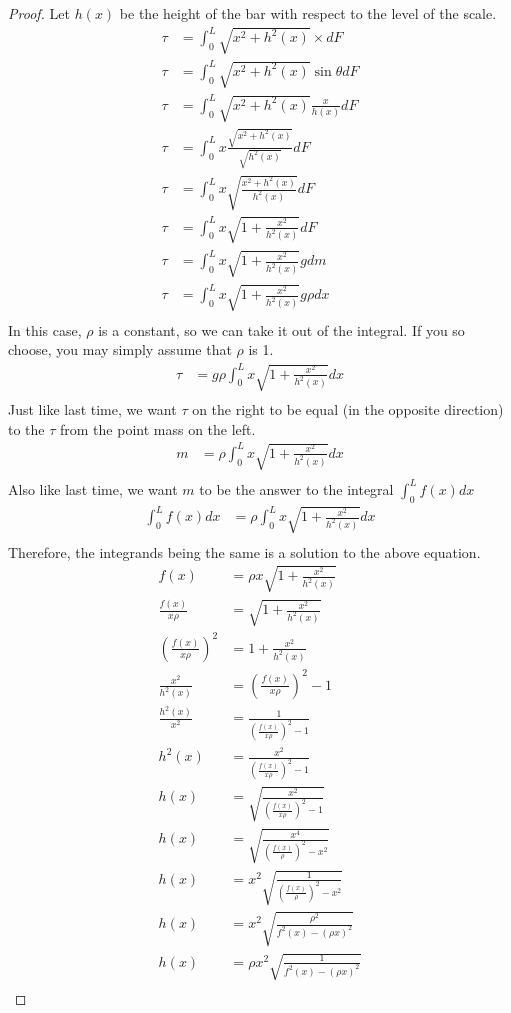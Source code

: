 \documentclass[letterpaper, 12pt]{article}
\begin{document}
\begin{proof}
	Let $h(x)$ be the height of the bar with respect to the level of the scale.
	\begin{align*}
		\tau &= \int_0^L \sqrt{x^2 + h^2(x)}\times dF\\
		\tau &= \int_0^L \sqrt{x^2 + h^2(x)}\sin\theta dF\\
		\tau &= \int_0^L \sqrt{x^2 + h^2(x)}\frac{x}{h(x)} dF\\
		\tau &= \int_0^L x\frac{\sqrt{x^2 + h^2(x)}}{\sqrt{h^2(x)}}dF\\
		\tau &= \int_0^L x\sqrt{\frac{x^2 + h^2(x)}{h^2(x)}}dF\\
		\tau &= \int_0^L x\sqrt{1 + \frac{x^2}{h^2(x)}}dF\\
		\tau &= \int_0^L x\sqrt{1 + \frac{x^2}{h^2(x)}}gdm\\
		\tau &= \int_0^L x\sqrt{1 + \frac{x^2}{h^2(x)}}g\rho dx\\
	\end{align*}
	In this case, $\rho$ is a constant, so we can take it out of the integral.
	If you so choose, you may simply assume that $\rho$ is 1.
	\begin{align*}
		\tau &= g\rho\int_0^L x\sqrt{1 + \frac{x^2}{h^2(x)}}dx\\
	\end{align*}
	Just like last time, we want $\tau$ on the right to be equal (in the opposite direction) to the $\tau$ from the point mass on the left.
	\begin{align*}
		m &= \rho\int_0^L x\sqrt{1 + \frac{x^2}{h^2(x)}}dx\\
	\end{align*}
	Also like last time, we want $m$ to be the answer to the integral $\int_0^L f(x) dx$
	\begin{align*}
		\int_0^Lf(x)dx &= \rho\int_0^L x\sqrt{1 + \frac{x^2}{h^2(x)}}dx\\
	\end{align*}
	Therefore, the integrands being the same is a solution to the above equation.
	\begin{align*}
		f(x) &= \rho x\sqrt{1 + \frac{x^2}{h^2(x)}}\\
		\frac{f(x)}{x\rho} &= \sqrt{1 + \frac{x^2}{h^2(x)}}\\
		(\frac{f(x)}{x\rho})^2 &= 1 + \frac{x^2}{h^2(x)}\\
		\frac{x^2}{h^2(x)} &= (\frac{f(x)}{x\rho})^2 - 1\\
		\frac{h^2(x)}{x^2} &= \frac{1}{(\frac{f(x)}{x\rho})^2 - 1}\\
		h^2(x) &= \frac{x^2}{(\frac{f(x)}{x\rho})^2 - 1}\\
		h(x) &= \sqrt{\frac{x^2}{(\frac{f(x)}{x\rho})^2 - 1}}\\
		h(x) &= \sqrt{\frac{x^4}{(\frac{f(x)}{\rho})^2 - x^2}}\\
		h(x) &= x^2\sqrt{\frac{1}{(\frac{f(x)}{\rho})^2 - x^2}}\\
		h(x) &= x^2\sqrt{\frac{\rho^2}{f^2(x) - (\rho x)^2}}\\
		h(x) &= \rho x^2\sqrt{\frac{1}{f^2(x) - (\rho x)^2}}\\
	\end{align*}
\end{proof}
\end{document}
